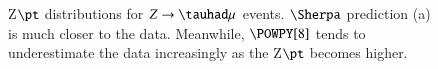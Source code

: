 \begin{figure}[htbp]
	\centering
	\hfill
	\caption{Z$\pt$ distributions for $Z\to\tauhad\mu$ events. $\Sherpa$ prediction (a) is much closer to the data. Meanwhile, $\POWPY[8]$ tends to underestimate the data increasingly as the Z$\pt$ becomes higher. }
	\label{Fig11}
\end{figure}
